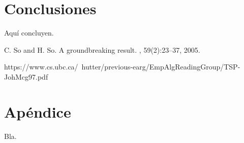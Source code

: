 \documentclass{ci5652}
\begin{document}
\section*{Conclusiones}

Aquí concluyen.


\small


\begin{thebibliography}{99}

C. So and H. So.
\newblock A groundbreaking result.
, 59(2):23--37, 2005.

\bibitem{}
  \newblock https://www.cs.ubc.ca/~hutter/previous-earg/EmpAlgReadingGroup/TSP-JohMcg97.pdf

\end{thebibliography}

\newpage
\section*{Apéndice}

Bla.
\end{document}
